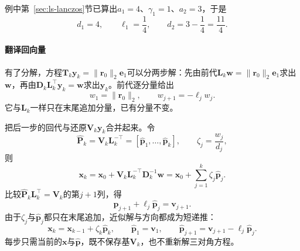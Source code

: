 例中第~\ref{sec:ls-lanczos}节已算出$a_1=4$、$\gamma_1=1$、$a_2=3$，于是
\[
 d_1=4,\qquad \ell_1=\frac14,\qquad d_2=3-\frac14=\frac{11}4 .
\]

\paragraph{翻译回向量}
有了分解，方程$\bm T_k\bm y_k=\lVert\bm r_0\rVert_2\bm e_1$可以分两步解：先由前代$\bm L_k\bm w=\lVert\bm r_0\rVert_2\bm e_1$求出$\bm w$，再由$\bm D_k\bm L_k^\top\bm y_k=\bm w$求出$\bm y_k$。前代逐分量给出
\begin{equation}
 w_1=\lVert\bm r_0\rVert_2,\qquad w_{j+1}=-\ell_jw_j .
 \label{eq:ls-cg-forward-substitution}
\end{equation}
它与$\bm L_k$一样只在末尾追加分量，已有分量不变。

把后一步的回代与还原$\bm V_k\bm y_k$合并起来。令
\[
 \widehat{\bm P}_k=\bm V_k\bm L_k^{-\top}=[\hat{\bm p}_1,\ldots,\hat{\bm p}_k],\qquad \zeta_j=\frac{w_j}{d_j},
\]
则
\[
 \bm x_k=\bm x_0+\bm V_k\bm L_k^{-\top}\bm D_k^{-1}\bm w=\bm x_0+\sum_{j=1}^k\zeta_j\hat{\bm p}_j .
\]
比较$\widehat{\bm P}_k\bm L_k^\top=\bm V_k$的第$j+1$列，得
\[
 \hat{\bm p}_{j+1}+\ell_j\hat{\bm p}_j=\bm v_{j+1} .
\]
由于$\zeta_j$与$\hat{\bm p}_j$都只在末尾追加，近似解与方向都成为短递推：
\begin{equation}
 \bm x_k=\bm x_{k-1}+\zeta_k\hat{\bm p}_k,\qquad
 \hat{\bm p}_1=\bm v_1,\qquad \hat{\bm p}_{j+1}=\bm v_{j+1}-\ell_j\hat{\bm p}_j .
 \label{eq:ls-cg-lanczos-short-recurrence}
\end{equation}
每步只需当前的$\bm x$与$\hat{\bm p}$，既不保存基$\bm V_k$，也不重新解三对角方程。

